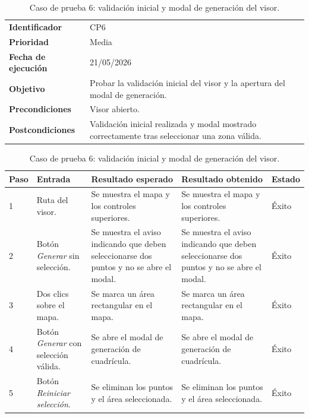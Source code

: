 \begin{table}[]
	\centering
	\footnotesize
	\renewcommand{\arraystretch}{1.2}
	\begin{tabularx}{\textwidth}{p{3.2cm} X}
		\toprule
		\textbf{Identificador} & CP6 \\
		\textbf{Prioridad} & Media \\
		\textbf{Fecha de ejecución} & 21/05/2026 \\
		\textbf{Objetivo} & Probar la validación inicial del visor y la apertura del modal de generación. \\
		\textbf{Precondiciones} & Visor abierto. \\
		\textbf{Postcondiciones} & Validación inicial realizada y modal mostrado correctamente tras seleccionar una zona válida. \\
		\midrule
	\end{tabularx}
	\begin{tabularx}{\textwidth}{p{0.8cm} p{3.2cm} X X p{1.3cm}}
		\textbf{Paso} & \textbf{Entrada} & \textbf{Resultado esperado} & \textbf{Resultado obtenido} & \textbf{Estado} \\
		\midrule
		1 & Ruta del visor. & Se muestra el mapa y los controles superiores. & Se muestra el mapa y los controles superiores. & Éxito \\
		2 & Botón \textit{Generar} sin selección. & Se muestra el aviso indicando que deben seleccionarse dos puntos y no se abre el modal. & Se muestra el aviso indicando que deben seleccionarse dos puntos y no se abre el modal. & Éxito \\
		3 & Dos clics sobre el mapa. & Se marca un área rectangular en el mapa. & Se marca un área rectangular en el mapa. & Éxito \\
		4 & Botón \textit{Generar} con selección válida. & Se abre el modal de generación de cuadrícula. & Se abre el modal de generación de cuadrícula. & Éxito \\
		5 & Botón \textit{Reiniciar selección}. & Se eliminan los puntos y el área seleccionada. & Se eliminan los puntos y el área seleccionada. & Éxito \\
		\bottomrule
	\end{tabularx}
	\caption{Caso de prueba 6: validación inicial y modal de generación del visor.}
	\label{tab:cp6}
\end{table}

